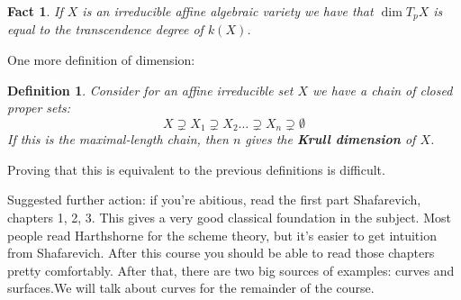 \documentclass[12pt]{article}
\newtheorem{fact}{Fact}[section]
\newtheorem{definition}{Definition}[section]
\begin{document}
    \begin{fact}
        If $X$ is an irreducible affine algebraic variety we have that $\dim T_pX$ is equal to the transcendence degree of $k(X)$. 
    \end{fact}
    One more definition of dimension:
    \begin{definition}
        Consider for an affine irreducible set $X$ we have a chain of closed proper sets: 
        $$X \supsetneq X_1 \supsetneq X_2 \dots \supsetneq X_n \supsetneq \emptyset $$
        If this is the maximal-length chain, then $n$ gives the \textbf{Krull dimension} of $X$. 
    \end{definition}
    Proving that this is equivalent to the previous definitions is difficult.\par 
    Suggested further action: if you're abitious, read the first part Shafarevich, chapters 1, 2, 3. This gives a very good classical foundation in the subject. Most people read Harthshorne for the scheme theory, but it's easier to get intuition from Shafarevich. After this course you should be able to read those chapters pretty comfortably. After that, there are two big sources of examples: curves and surfaces.We will talk about curves for the remainder of the course. 
\end{document}
